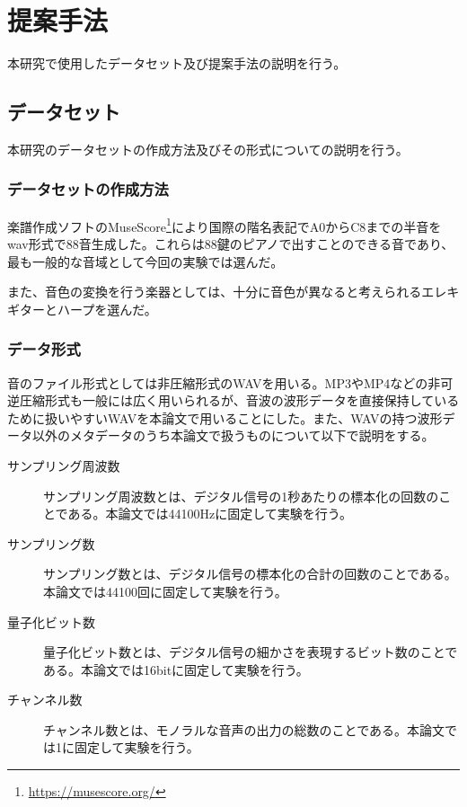 \chapter{提案手法}

本研究で使用したデータセット及び提案手法の説明を行う。

\section{データセット}

本研究のデータセットの作成方法及びその形式についての説明を行う。

\subsection{データセットの作成方法}

楽譜作成ソフトのMuseScore\footnote{\url{https://musescore.org/}}により国際の階名表記でA0からC8までの半音をwav形式で88音生成した。これらは88鍵のピアノで出すことのできる音であり、最も一般的な音域として今回の実験では選んだ。

また、音色の変換を行う楽器としては、十分に音色が異なると考えられるエレキギターとハープを選んだ。

\subsection{データ形式}

音のファイル形式としては非圧縮形式のWAVを用いる。MP3やMP4などの非可逆圧縮形式も一般には広く用いられるが、音波の波形データを直接保持しているために扱いやすいWAVを本論文で用いることにした。また、WAVの持つ波形データ以外のメタデータのうち本論文で扱うものについて以下で説明をする。

\begin{description}

\item[サンプリング周波数]\mbox{}

サンプリング周波数とは、デジタル信号の1秒あたりの標本化の回数のことである。本論文では44100Hzに固定して実験を行う。

\item[サンプリング数]\mbox{}

サンプリング数とは、デジタル信号の標本化の合計の回数のことである。本論文では44100回に固定して実験を行う。

\item[量子化ビット数]\mbox{}

量子化ビット数とは、デジタル信号の細かさを表現するビット数のことである。本論文では16bitに固定して実験を行う。

\item[チャンネル数]\mbox{}

チャンネル数とは、モノラルな音声の出力の総数のことである。本論文では1に固定して実験を行う。

\end{description}

